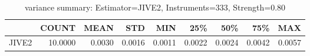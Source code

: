 \begin{table}[ht]
\centering
\caption{variance summary: Estimator=JIVE2, Instruments=333, Strength=0.80}
\begin{tabular}{lrrrrrrrr}
\toprule
 & COUNT & MEAN & STD & MIN & 25\% & 50\% & 75\% & MAX \\
\midrule
JIVE2 & 10.0000 & 0.0030 & 0.0016 & 0.0011 & 0.0022 & 0.0024 & 0.0042 & 0.0057 \\
\bottomrule
\end{tabular}
\end{table}
